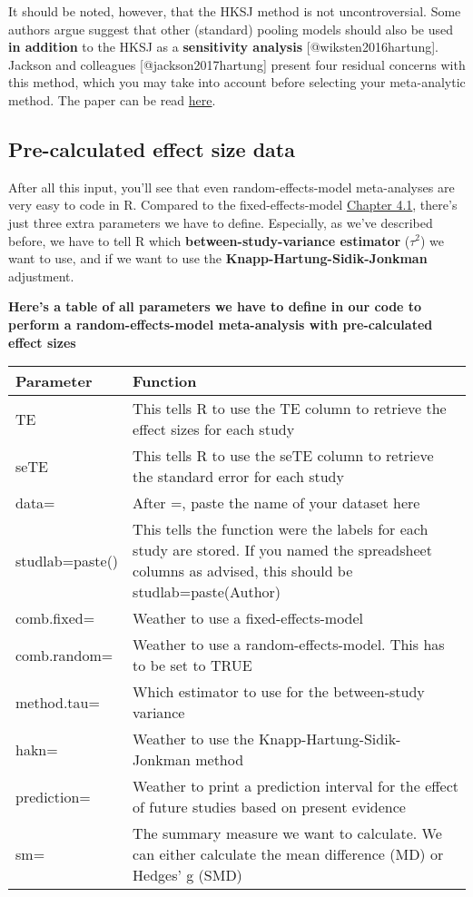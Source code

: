 \documentclass[]{book}
\theoremstyle{definition}
\theoremstyle{definition}
\theoremstyle{definition}
\theoremstyle{remark}
\begin{document}
\begin{rmdachtung}
It should be noted, however, that the HKSJ method is not
uncontroversial. Some authors argue suggest that other (standard)
pooling models should also be used \textbf{in addition} to the HKSJ as a
\textbf{sensitivity analysis} {[}@wiksten2016hartung{]}. Jackson and
colleagues {[}@jackson2017hartung{]} present four residual concerns with
this method, which you may take into account before selecting your
meta-analytic method. The paper can be read
\href{https://onlinelibrary.wiley.com/doi/pdf/10.1002/sim.7411}{here}.
\end{rmdachtung}

\subsection{Pre-calculated effect size
data}\label{pre-calculated-effect-size-data-1}

After all this input, you'll see that even random-effects-model
meta-analyses are very easy to code in R. Compared to the
fixed-effects-model \protect\hyperlink{fixed}{Chapter 4.1}, there's just
three extra parameters we have to define. Especially, as we've described
before, we have to tell R which \textbf{between-study-variance
estimator} (\(\tau^{2}\)) we want to use, and if we want to use the
\textbf{Knapp-Hartung-Sidik-Jonkman} adjustment.

\textbf{Here's a table of all parameters we have to define in our code
to perform a random-effects-model meta-analysis with pre-calculated
effect sizes}

\begin{tabular}{l|l}
\hline
Parameter & Function\\
\hline
TE & This tells R to use the TE column to retrieve the effect sizes for each study\\
\hline
seTE & This tells R to use the seTE column to retrieve the standard error for each             study\\
\hline
data= & After =, paste the name of your dataset here\\
\hline
studlab=paste() & This tells the function were the labels for each study are stored. If you named the spreadsheet columns as advised, this should be studlab=paste(Author)\\
\hline
comb.fixed= & Weather to use a fixed-effects-model\\
\hline
comb.random= & Weather to use a random-effects-model. This has to be set to TRUE\\
\hline
method.tau= & Which estimator to use for the between-study variance\\
\hline
hakn= & Weather to use the Knapp-Hartung-Sidik-Jonkman method\\
\hline
prediction= & Weather to print a prediction interval for the effect of future studies based on present evidence\\
\hline
sm= & The summary measure we want to calculate. We can either calculate the mean difference (MD) or Hedges' g (SMD)\\
\hline
\end{tabular}
\end{document}
